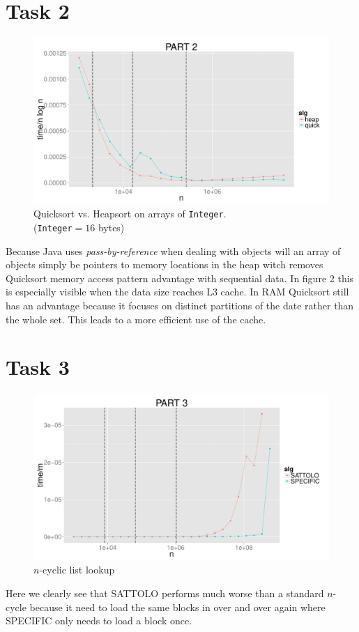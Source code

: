 \documentclass{article}
\begin{document}
\section*{Task 2}
\begin{figure}[H]
    \centering
    \includegraphics[width=
    \textwidth]{images/part2.pdf}
    \caption{Quicksort vs. Heapsort on arrays of \texttt{Integer}. 
    \\(\texttt{Integer}$= 16$ bytes)}
    \label{fig:awesome_image}
\end{figure}
Because Java uses \textit{pass-by-reference} when dealing with objects will an 
array of objects simply be pointers to memory locations in the heap witch 
removes Quicksort memory access pattern advantage with sequential data.
In figure 2 this is especially visible when the data size reaches L3 cache. In 
RAM Quicksort still has an advantage because it focuses on distinct partitions
of the date rather than the whole set. This leads to a more efficient use of the 
cache.
\section*{Task 3}
\begin{figure}[H]
    \centering
    \includegraphics[width=\textwidth]{images/part3.pdf}
    \caption{$n$-cyclic list lookup}
    \label{fig:awesome_image}
\end{figure}
Here we clearly see that SATTOLO performs much worse than a standard $n$-cycle 
because it need to load the same blocks in over and over again where SPECIFIC
only needs to load a block once.
\end{document}
